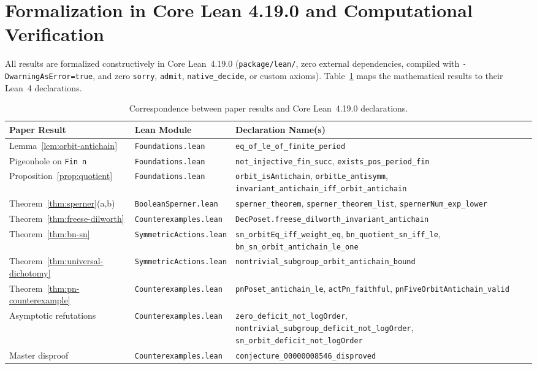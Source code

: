 \documentclass[11pt,a4paper]{article}
\theoremstyle{definition}
\begin{document}
\section{Formalization in Core Lean 4.19.0 and Computational Verification}

All results are formalized constructively in Core Lean~4.19.0 (\texttt{package/lean/}, zero external dependencies, compiled with \texttt{-DwarningAsError=true}, and zero \texttt{sorry}, \texttt{admit}, \texttt{native\_decide}, or custom axioms). Table~\ref{tab:lean-map} maps the mathematical results to their Lean~4 declarations.

\begin{table}[ht]
\centering
\footnotesize
\caption{Correspondence between paper results and Core Lean~4.19.0 declarations.}
\label{tab:lean-map}
\begin{tabular}{@{}ll>{\raggedright\arraybackslash}p{7.6cm}@{}}
\toprule
\textbf{Paper Result} & \textbf{Lean Module} & \textbf{Declaration Name(s)} \\
\midrule
Lemma~\ref{lem:orbit-antichain} & \texttt{Foundations.lean} & \texttt{eq\_of\_le\_of\_finite\_period} \\
Pigeonhole on \texttt{Fin n} & \texttt{Foundations.lean} & \texttt{not\_injective\_fin\_succ}, \texttt{exists\_pos\_period\_fin} \\
Proposition~\ref{prop:quotient} & \texttt{Foundations.lean} & \texttt{orbit\_isAntichain}, \texttt{orbitLe\_antisymm}, \texttt{invariant\_antichain\_iff\_orbit\_antichain} \\
Theorem~\ref{thm:sperner}(a,b) & \texttt{BooleanSperner.lean} & \texttt{sperner\_theorem}, \texttt{sperner\_theorem\_list}, \texttt{spernerNum\_exp\_lower} \\
Theorem~\ref{thm:freese-dilworth} & \texttt{Counterexamples.lean} & \texttt{DecPoset.freese\_dilworth\_invariant\_antichain} \\
Theorem~\ref{thm:bn-sn} & \texttt{SymmetricActions.lean} & \texttt{sn\_orbitEq\_iff\_weight\_eq}, \texttt{bn\_quotient\_sn\_iff\_le}, \texttt{bn\_sn\_orbit\_antichain\_le\_one} \\
Theorem~\ref{thm:universal-dichotomy} & \texttt{SymmetricActions.lean} & \texttt{nontrivial\_subgroup\_orbit\_antichain\_bound} \\
Theorem~\ref{thm:pn-counterexample} & \texttt{Counterexamples.lean} & \texttt{pnPoset\_antichain\_le}, \texttt{actPn\_faithful}, \texttt{pnFiveOrbitAntichain\_valid} \\
Asymptotic refutations & \texttt{Counterexamples.lean} & \texttt{zero\_deficit\_not\_logOrder}, \texttt{nontrivial\_subgroup\_deficit\_not\_logOrder}, \texttt{sn\_orbit\_deficit\_not\_logOrder} \\
Master disproof & \texttt{Counterexamples.lean} & \texttt{conjecture\_00000008546\_disproved} \\
\bottomrule
\end{tabular}
\end{table}
\end{document}
